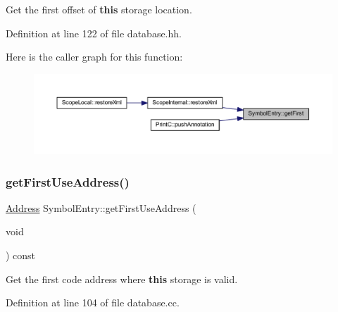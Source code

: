 Get the first offset of {\bfseries{this}} storage location. 



Definition at line 122 of file database.\+hh.

Here is the caller graph for this function\+:
\nopagebreak
\begin{figure}[H]
\begin{center}
\leavevmode
\includegraphics[width=350pt]{class_symbol_entry_af4927191c7a854bde58782700c5a5f63_icgraph}
\end{center}
\end{figure}
\mbox{\label{class_symbol_entry_a856e7005f430c40b54c97ee886476e8a}} 
\subsubsection{\texorpdfstring{getFirstUseAddress()}{getFirstUseAddress()}}
{\footnotesize\ttfamily \mbox{\hyperlink{class_address}{Address}} Symbol\+Entry\+::get\+First\+Use\+Address (\begin{DoxyParamCaption}\item[{void}]{ }\end{DoxyParamCaption}) const}



Get the first code address where {\bfseries{this}} storage is valid. 



Definition at line 104 of file database.\+cc.

